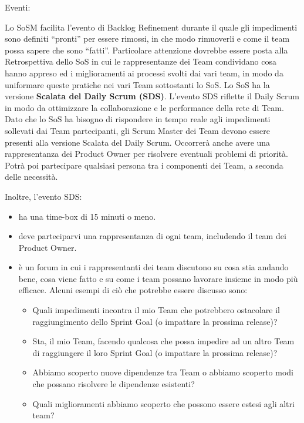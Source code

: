 \documentclass[12pt,a4paper,parskip=full]{scrartcl}
\begin{document}
Eventi:

Lo SoSM facilita l'evento di Backlog Refinement durante il quale gli impedimenti sono definiti ``pronti'' per essere rimossi, in che modo rimuoverli e come il team possa sapere che sono ``fatti''. Particolare attenzione dovrebbe essere posta alla Retrospettiva dello SoS in cui le rappresentanze dei Team condividano cosa hanno appreso ed i miglioramenti ai processi svolti dai vari team, in modo da uniformare queste pratiche nei vari Team sottostanti lo SoS.
Lo SoS ha la versione \textbf{Scalata del Daily Scrum (SDS)}. L'evento SDS riflette il Daily Scrum in modo da ottimizzare la collaborazione e le performance della rete di Team. Dato che lo SoS ha bisogno di rispondere in tempo reale agli impedimenti sollevati dai Team partecipanti, gli Scrum Master dei Team devono essere presenti alla versione Scalata del Daily Scrum. Occorrerà anche avere una rappresentanza dei Product Owner per risolvere eventuali problemi di priorità. Potrà poi partecipare qualsiasi persona tra i componenti dei Team, a seconda delle necessità.

Inoltre, l'evento SDS:

\begin{itemize}
\item ha una time-box di 15 minuti o meno.
\item deve parteciparvi una rappresentanza di ogni team, includendo il team dei Product Owner.
\item è un forum in cui i rappresentanti dei team discutono su cosa stia andando bene, cosa viene fatto e su come i team possano lavorare insieme in modo più efficace. Alcuni esempi di ciò che potrebbe essere discusso sono:
\begin{itemize}
\item Quali impedimenti incontra il mio Team che potrebbero ostacolare il raggiungimento dello Sprint Goal (o impattare la prossima release)? 
\item Sta, il mio Team, facendo qualcosa che possa impedire ad un altro Team di raggiungere il loro Sprint Goal (o impattare la prossima release)?
\item Abbiamo scoperto nuove dipendenze tra Team o abbiamo scoperto modi che possano risolvere le dipendenze esistenti?
\item Quali miglioramenti abbiamo scoperto che possono essere estesi agli altri team?
\end{itemize}
\end{itemize}
\end{document}
